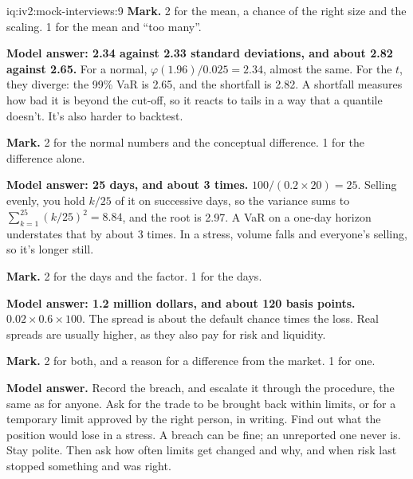 \begin{solution}{iq:iv2:mock-interviews:9}
\textbf{Mark.} 2 for the mean, a chance of the right size and the scaling. 1 for the mean and ``too many''.

\ivstop
\textbf{Model answer: 2.34 against 2.33 standard deviations, and about 2.82 against 2.65.} For a normal, $\varphi(1.96)/0.025 = 2.34$, almost the same. For the $t$, they diverge: the 99\% VaR is 2.65, and the shortfall is 2.82. A shortfall measures how bad it is beyond the cut-off, so it reacts to tails in a way that a quantile doesn't. It's also harder to backtest.

\textbf{Mark.} 2 for the normal numbers and the conceptual difference. 1 for the difference alone.

\ivstop
\textbf{Model answer: 25 days, and about 3 times.} $100/(0.2 \times 20) = 25$. Selling evenly, you hold $k/25$ of it on successive days, so the variance sums to $\sum_{k = 1}^{25}(k/25)^2 = 8.84$, and the root is 2.97. A VaR on a one-day horizon understates that by about 3 times. In a stress, volume falls and everyone's selling, so it's longer still.

\textbf{Mark.} 2 for the days and the factor. 1 for the days.

\ivstop
\textbf{Model answer: 1.2 million dollars, and about 120 basis points.} $0.02 \times 0.6 \times 100$. The spread is about the default chance times the loss. Real spreads are usually higher, as they also pay for risk and liquidity.

\textbf{Mark.} 2 for both, and a reason for a difference from the market. 1 for one.

\ivstop
\textbf{Model answer.} Record the breach, and escalate it through the procedure, the same as for anyone. Ask for the trade to be brought back within limits, or for a temporary limit approved by the right person, in writing. Find out what the position would lose in a stress. A breach can be fine; an unreported one never is. Stay polite. Then ask how often limits get changed and why, and when risk last stopped something and was right.


\end{solution}
